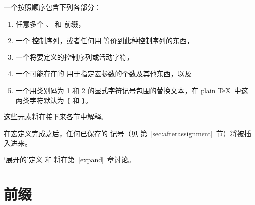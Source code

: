 \documentclass{book}
\begin{document}
一个按照顺序包含下列各部分：
\begin{enumerate}
\item 任意多个 、 和  前缀，
\item 一个  控制序列，或者任何用  等价到此种控制序列的东西，
\item 一个将要定义的控制序列或活动字符，
\item 一个可能存在的  用于指定宏参数的个数及其他东西，以及
\item 一个用类别码为 1 和 2
的显式字符记号包围的替换文本，在 plain \TeX\ 中这两类字符默认为
\verb-{- 和 \verb-}-。
\end{enumerate}
这些元素将在接下来各节中解释。

在宏定义完成之后，任何已保存的  记号（见
第~\ref{sec:afterassignment}~节）将被插入进来。

`展开的'定义  和  将在第~\ref{expand}~章讨论。

\section{前缀}
\end{document}
